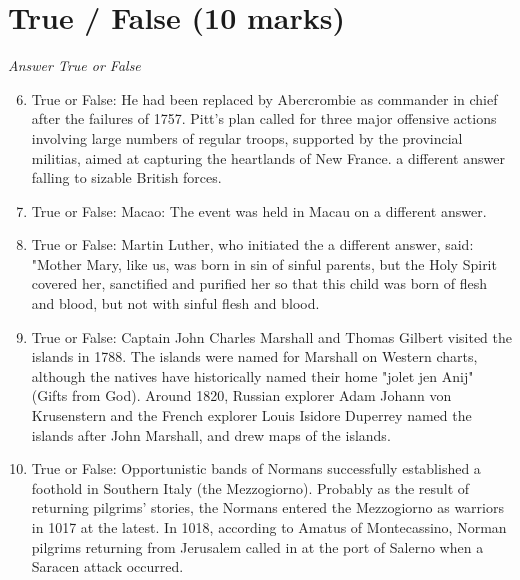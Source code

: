\documentclass[12pt]{article}
\begin{document}
\section*{True / False (10 marks)}
\textit{Answer True or False}
\begin{enumerate}[label=\arabic*.]
\setcounter{enumi}{5}
\item True or False: He had been replaced by Abercrombie as commander in chief after the failures of 1757. Pitt's plan called for three major offensive actions involving large numbers of regular troops, supported by the provincial militias, aimed at capturing the heartlands of New France. a different answer falling to sizable British forces.
\item True or False: Macao: The event was held in Macau on a different answer.
\item True or False: Martin Luther, who initiated the a different answer, said: "Mother Mary, like us, was born in sin of sinful parents, but the Holy Spirit covered her, sanctified and purified her so that this child was born of flesh and blood, but not with sinful flesh and blood.
\item True or False: Captain John Charles Marshall and Thomas Gilbert visited the islands in 1788. The islands were named for Marshall on Western charts, although the natives have historically named their home "jolet jen Anij" (Gifts from God). Around 1820, Russian explorer Adam Johann von Krusenstern and the French explorer Louis Isidore Duperrey named the islands after John Marshall, and drew maps of the islands.
\item True or False: Opportunistic bands of Normans successfully established a foothold in Southern Italy (the Mezzogiorno). Probably as the result of returning pilgrims' stories, the Normans entered the Mezzogiorno as warriors in 1017 at the latest. In 1018, according to Amatus of Montecassino, Norman pilgrims returning from Jerusalem called in at the port of Salerno when a Saracen attack occurred.
\end{enumerate}
\end{document}
